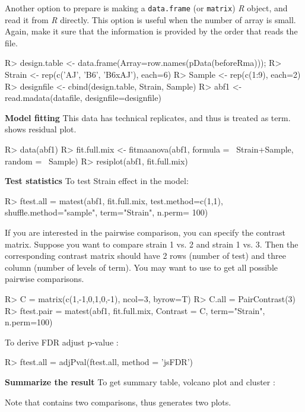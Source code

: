 Another option to prepare  is making a {\tt data.frame}
(or {\tt matrix}) {\em R} object, and read it from {\em R} directly. This option is useful when the number of array is small. Again, make it sure that the information is provided by the order that  reads the file.  
\begin{Sinput}
R> design.table <- data.frame(Array=row.names(pData(beforeRma)));
R> Strain <- rep(c('AJ', 'B6', 'B6xAJ'), each=6)
R> Sample <- rep(c(1:9), each=2)
R> designfile <- cbind(design.table, Strain, Sample)
R> abf1 <- read.madata(datafile, designfile=designfile)
\end{Sinput}
{\bf Model fitting} This data has technical replicates, and thus  is treated as  term.  shows residual plot. 
\begin{Sinput}
R> data(abf1)
R> fit.full.mix <- fitmaanova(abf1, formula = ~Strain+Sample, 
   random = ~Sample)
R> resiplot(abf1, fit.full.mix)
\end{Sinput}
{\bf Test statistics} To test Strain effect in the model:
\begin{Sinput}
R> ftest.all = matest(abf1, fit.full.mix, test.method=c(1,1),
    shuffle.method="sample", term="Strain", n.perm= 100)
\end{Sinput}
If you are interested in the pairwise comparison, you can specify the contrast
matrix. Suppose you want to compare strain 1 vs. 2 and
strain 1 vs. 3. Then the corresponding contrast matrix should have 2 rows
(number of test) and three column (number of levels of
term). You may want to use  to get all possible pairwise comparisons.  
\begin{Sinput}
R> C = matrix(c(1,-1,0,1,0,-1), ncol=3, byrow=T)
R> C.all = PairContrast(3)
R> ftest.pair = matest(abf1, fit.full.mix, Contrast = C, 
   term="Strain", n.perm=100)
\end{Sinput}
To derive FDR adjust p-value :
\begin{Sinput}
R> ftest.all = adjPval(ftest.all, method = 'jsFDR')
\end{Sinput}
{\bf Summarize the result} To get summary table, volcano plot and cluster :  
Note that  contains two comparisons, thus
 generates two plots. 